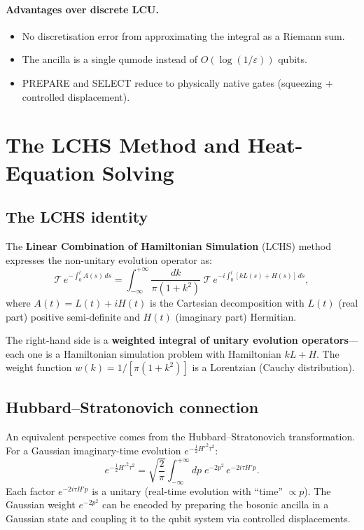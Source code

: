 \documentclass[11pt]{article}
\begin{document}
\paragraph{Advantages over discrete LCU.}
\begin{itemize}[nosep]
\item No discretisation error from approximating the integral as a
  Riemann sum.
\item The ancilla is a single qumode instead of
  $O(\log(1/\varepsilon))$ qubits.
\item PREPARE and SELECT reduce to physically native gates (squeezing
  + controlled displacement).
\end{itemize}

\section{The LCHS Method and Heat-Equation Solving}
\label{sec:lchs}

\subsection{The LCHS identity}

The \textbf{Linear Combination of Hamiltonian Simulation} (LCHS) method
\cite{An2023LCHS,An2025LCHS} expresses the non-unitary evolution operator
as:
\begin{equation}\label{eq:lchs-identity}
\boxed{
\mathcal{T}\, e^{-\int_0^t A(s)\, ds}
= \int_{-\infty}^{+\infty} \frac{dk}{\pi(1 + k^2)}\;
\mathcal{T}\, e^{-i\int_0^t [kL(s) + H(s)]\, ds},
}
\end{equation}
where $A(t) = L(t) + iH(t)$ is the Cartesian decomposition with $L(t)$
(real part) positive semi-definite and $H(t)$ (imaginary part) Hermitian.

The right-hand side is a \textbf{weighted integral of unitary evolution
operators}---each one is a Hamiltonian simulation problem with
Hamiltonian $kL + H$.
The weight function $w(k) = 1/[\pi(1+k^2)]$ is a Lorentzian (Cauchy
distribution).

\subsection{Hubbard--Stratonovich connection}

An equivalent perspective comes from the Hubbard--Stratonovich
transformation.  For a Gaussian imaginary-time evolution
$e^{-\frac{1}{2}H'^2\tau^2}$:
\begin{equation}\label{eq:hs-transform}
e^{-\frac{1}{2}H'^2\tau^2}
= \sqrt{\frac{2}{\pi}} \int_{-\infty}^{+\infty} dp\;
e^{-2p^2}\, e^{-2i\tau H' p}.
\end{equation}
Each factor $e^{-2i\tau H' p}$ is a unitary (real-time evolution with
``time'' $\propto p$).  The Gaussian weight $e^{-2p^2}$ can be encoded
by preparing the bosonic ancilla in a Gaussian state and coupling it to
the qubit system via controlled displacements.
\end{document}
